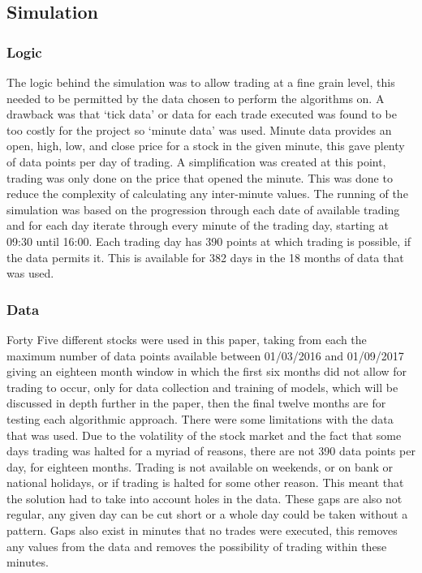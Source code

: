 \documentclass[12pt,a4paper]{article}
\begin{document}
\iffalse
This section presents the solutions to the problems in detail.  The design and implementation details should all be placed in this section.  You may create a number of subsections, each focussing on one issue.
This section should be between 4 to 7 pages in length.
\fi

\iffalse
#################################################################################
\fi

\subsection*{Simulation}

\subsubsection*{Logic}

The logic behind the simulation was to allow trading at a fine grain level, this needed to be permitted by the data chosen to perform the algorithms on. A drawback was that `tick data' or data for each trade executed was found to be too costly for the project so `minute data' was used. Minute data provides an open, high, low, and close price for a stock in the given minute, this gave plenty of data points per day of trading. A simplification was created at this point, trading was only done on the price that opened the minute. This was done to reduce the complexity of calculating any inter-minute values. The running of the simulation was based on the progression through each date of available trading and for each day iterate through every minute of the trading day, starting at 09:30 until 16:00. Each trading day has 390 points at which trading is possible, if the data permits it. This is available for 382 days in the 18 months of data that was used. 

\subsubsection*{Data}

Forty Five different stocks were used in this paper, taking from each the maximum number of data points available between 01/03/2016 and 01/09/2017 giving an eighteen month window in which the first six months did not allow for trading to occur, only for data collection and training of models, which will be discussed in depth further in the paper, then the final twelve months are for testing each algorithmic approach. There were some limitations with the data that was used. Due to the volatility of the stock market and the fact that some days trading was halted for a myriad of reasons, there are not 390 data points per day, for eighteen months. Trading is not available on weekends, or on bank or national holidays, or if trading is halted for some other reason. This meant that the solution had to take into account holes in the data. These gaps are also not regular, any given day can be cut short or a whole day could be taken without a pattern. Gaps also exist in minutes that no trades were executed, this removes any values from the data and removes the possibility of trading within these minutes.\\
\end{document}
